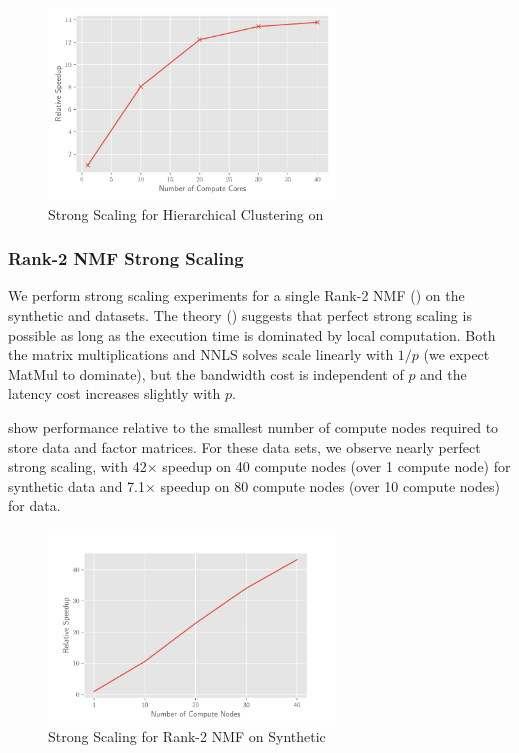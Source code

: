 \begin{figure}
\begin{center}
\includegraphics[height=2in, width=\columnwidth]{plots/dc_hierarchical_speedup.pdf}
\caption{Strong Scaling for Hierarchical Clustering on \hyper{}}
\label{fig:dcspeedup}
\end{center}
\end{figure}


\subsubsection{Rank-2 NMF Strong Scaling}

We perform strong scaling experiments for a single Rank-2 NMF () on the synthetic and \image{} datasets.
The theory () suggests that perfect strong scaling is possible as long as the execution time is dominated by local computation.
Both the matrix multiplications and NNLS solves scale linearly with $1/p$ (we expect MatMul to dominate), but the bandwidth cost is independent of $p$ and the latency cost increases slightly with $p$.

 show performance relative to the smallest number of compute nodes required to store data and factor matrices.
For these data sets, we observe nearly perfect strong scaling, with 42$\times$ speedup on 40 compute nodes (over 1 compute node) for synthetic data and 7.1$\times$ speedup on 80 compute nodes (over 10 compute nodes) for \image{} data.

\begin{figure}
\begin{center}
\includegraphics[height=2in, width=\columnwidth]{plots/synthetic_rank2_speedup.pdf}
\caption{Strong Scaling for Rank-2 NMF on Synthetic}
\label{fig:synrank2speedup}
\end{center}
\end{figure}

